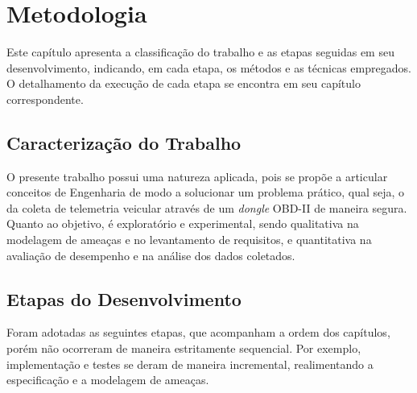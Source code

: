 \chapter{Metodologia} \label{cap:metodologia}

Este capítulo apresenta a classificação do trabalho e as etapas seguidas em seu desenvolvimento, indicando, em cada etapa, os métodos e as técnicas empregados. O detalhamento da execução de cada etapa se encontra em seu capítulo correspondente.

\section{Caracterização do Trabalho}

O presente trabalho possui uma natureza aplicada, pois se propõe a articular conceitos de Engenharia de modo a solucionar um problema prático, qual seja, o da coleta de telemetria veicular através de um \textit{dongle} OBD-II de maneira segura. Quanto ao objetivo, é exploratório e experimental, sendo qualitativa na modelagem de ameaças e no levantamento de requisitos, e quantitativa na avaliação de desempenho e na análise dos dados coletados.

\section{Etapas do Desenvolvimento}

Foram adotadas as seguintes etapas, que acompanham a ordem dos capítulos, porém não ocorreram de maneira estritamente sequencial. Por exemplo, implementação e testes se deram de maneira incremental, realimentando a especificação e a modelagem de ameaças.

